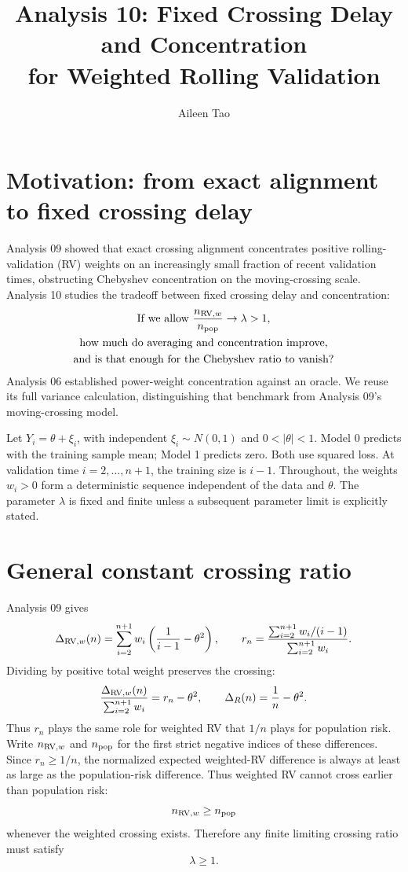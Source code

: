 \documentclass[11pt]{article}
\title{Analysis 10: Fixed Crossing Delay and Concentration\\
for Weighted Rolling Validation}
\author{Aileen Tao}
\date{}
\theoremstyle{definition}
\begin{document}
\maketitle

\section{Motivation: from exact alignment to fixed crossing delay}

Analysis 09 showed that exact crossing alignment concentrates positive
rolling-validation (RV) weights on an increasingly small fraction of
recent validation times, obstructing Chebyshev concentration on the
moving-crossing scale. Analysis 10 studies the tradeoff between fixed
crossing delay and concentration:
\[
\begin{gathered}
\text{If we allow }\frac{n_{{\rm RV},w}}{n_{\rm pop}}\to\lambda>1,\\
\text{how much do averaging and concentration improve,}\\
\text{and is that enough for the Chebyshev ratio to vanish?}
\end{gathered}
\]
Analysis 06 established power-weight concentration against an oracle.
We reuse its full variance calculation, distinguishing that benchmark
from Analysis 09's moving-crossing model.

Let $Y_i=\theta+\xi_i$, with independent $\xi_i\sim N(0,1)$ and
$0<|\theta|<1$. Model 0 predicts with the training sample mean;
Model 1 predicts zero. Both use squared loss. At validation time
$i=2,\ldots,n+1$, the training size is $i-1$. Throughout, the weights
$w_i>0$ form a deterministic sequence independent of the data and
$\theta$. The parameter $\lambda$ is fixed and finite unless a
subsequent parameter limit is explicitly stated.

\section{General constant crossing ratio}

Analysis 09 gives
\[
\Delta_{{\rm RV},w}(n)
=\sum_{i=2}^{n+1}w_i\left(\frac1{i-1}-\theta^2\right),
\qquad
r_n=\frac{\sum_{i=2}^{n+1}w_i/(i-1)}{\sum_{i=2}^{n+1}w_i}.
\]
Dividing by positive total weight preserves the crossing:
\[
\frac{\Delta_{{\rm RV},w}(n)}{\sum_{i=2}^{n+1}w_i}
=r_n-\theta^2,\qquad \Delta_R(n)=\frac1n-\theta^2.
\]
Thus $r_n$ plays the same role for weighted RV that $1/n$ plays for
population risk. Write $n_{{\rm RV},w}$ and $n_{\rm pop}$ for the first
strict negative indices of these differences. Since $r_n\ge1/n$, the
normalized expected weighted-RV difference is always at least as large
as the population-risk difference. Thus weighted RV cannot cross earlier
than population risk:
\[
n_{{\rm RV},w}\ge n_{\rm pop}
\]
whenever the weighted crossing exists. Therefore any finite limiting
crossing ratio must satisfy
\[
\lambda\ge1.
\]
\end{document}
